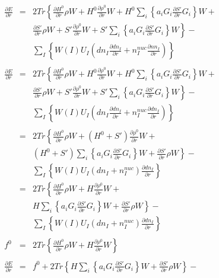 \documentclass{article}
\begin{document}
\begin{eqnarray*}
\frac{\partial E}{\partial r} & = & 2 Tr \left\{ \frac{\partial H^0}{\partial r} \rho W + H^0 \frac{\partial \rho^0}{\partial r} W + H^0 \sum_i \left\{ a_i G_i \frac{\partial S'}{\partial r} G_i \right\} W + \right. \\
&&	     \left. \frac{\partial S'}{\partial r} \rho W + S' \frac{\partial \rho^0}{\partial r} W + S' \sum_i \left\{ a_i G_i \frac{\partial S'}{\partial r} G_i \right\} W \right\} - \\
&&	\sum_I \left\{ W(I) U_I ( dn_I \frac{\partial dn_I}{\partial r} + n^{nuc}_I \frac{\partial nn_I}{\partial r} ) \right\} \\
 \\
\frac{\partial E}{\partial r} & = & 2 Tr \left\{ \frac{\partial H^0}{\partial r} \rho W + H^0 \frac{\partial \rho^0}{\partial r} W + H^0 \sum_i \left\{a_i G_i \frac{\partial S'}{\partial r} G_i \right\} W + \right. \\
&&             \left. \frac{\partial S'}{\partial r} \rho W + S' \frac{\partial \rho^0}{\partial r} W + S' \sum_i \left\{ a_i G_i \frac{\partial S'}{\partial r} G_i \right\} W \right\} - \\
&&	\sum_I \left\{ W(I) U_I (dn_I \frac{\partial dn_I}{\partial r} + n^{nuc}_I \frac{\partial dn_I}{\partial r} ) \right\} \\
 \\
      & = & 2 Tr \left\{ \frac{\partial H^0}{\partial r} \rho W + (H^0+S') \frac{\partial \rho^0}{\partial r} W + \right. \\
&&	     \left. (H^0+S') \sum_i \left\{ a_i G_i \frac{\partial S'}{\partial r} G_i \right\} W + \frac{\partial S'}{\partial r} \rho W \right\} - \\
&&	\sum_I \left\{ W(I) U_I (dn_I + n^{nuc}_I) \frac{\partial dn_I}{\partial r} \right\} \\
      & = & 2 Tr \left\{ \frac{\partial H^0}{\partial r} \rho W + H \frac{\partial \rho^0}{\partial r} W + \right. \\
&&	     \left. H \sum_i \left\{ a_i G_i \frac{\partial S'}{\partial r} G_i \right\} W + \frac{\partial S'}{\partial r} \rho W \right\} - \\
&&	\sum_I \left\{ W(I) U_I (dn_I + n^{nuc}_I) \frac{\partial dn_I}{\partial r} \right\} \\
\\
f^0 & = & 2 Tr \left\{ \frac{\partial H^0}{\partial r} \rho W + H \frac{\partial \rho^0}{\partial r} W \right\} \\
\\
\frac{\partial E}{\partial r}  & = & f^0 + 2 Tr \left\{ H \sum_i \left\{ a_i G_i \frac{\partial S'}{\partial r} G_i \right\} W + \frac{\partial S'}{\partial r} \rho W \right\} - \\

\end{eqnarray*}
\end{document}
